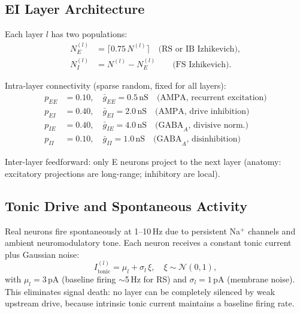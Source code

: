 \documentclass[11pt,a4paper]{article}
\begin{document}
\subsection{EI Layer Architecture}

Each layer $l$ has two populations:
\begin{equation}\label{eq:ei_layer}
\begin{aligned}
  N_E^{(l)} &= \lceil 0.75\,N^{(l)} \rceil \quad \text{(RS or IB Izhikevich)}, \\
  N_I^{(l)} &= N^{(l)} - N_E^{(l)} \quad\quad \text{(FS Izhikevich)}.
\end{aligned}
\end{equation}

Intra-layer connectivity (sparse random, fixed for all layers):
\begin{equation}\label{eq:ei_conn}
\begin{aligned}
  p_{EE} &= 0.10, \quad \bar{g}_{EE} = 0.5\,\text{nS} \quad\text{(AMPA, recurrent excitation)} \\
  p_{EI} &= 0.40, \quad \bar{g}_{EI} = 2.0\,\text{nS} \quad\text{(AMPA, drive inhibition)} \\
  p_{IE} &= 0.40, \quad \bar{g}_{IE} = 4.0\,\text{nS} \quad\text{(GABA}_A\text{, divisive norm.)} \\
  p_{II} &= 0.10, \quad \bar{g}_{II} = 1.0\,\text{nS} \quad\text{(GABA}_A\text{, disinhibition)}
\end{aligned}
\end{equation}

Inter-layer feedforward: only E neurons project to the next layer
(anatomy: excitatory projections are long-range; inhibitory are local).

\subsection{Tonic Drive and Spontaneous Activity}

Real neurons fire spontaneously at 1--10\,Hz due to persistent Na$^+$ channels
and ambient neuromodulatory tone.
Each neuron receives a constant tonic current plus Gaussian noise:
\begin{equation}\label{eq:tonic}
  I_\text{tonic}^{(l)} = \mu_l + \sigma_l\,\xi, \quad \xi \sim \mathcal{N}(0,1),
\end{equation}
with $\mu_l = 3$\,pA (baseline firing $\sim$5\,Hz for RS) and
$\sigma_l = 1$\,pA (membrane noise).
This eliminates signal death: no layer can be completely silenced by
weak upstream drive, because intrinsic tonic current maintains a
baseline firing rate.
\end{document}
